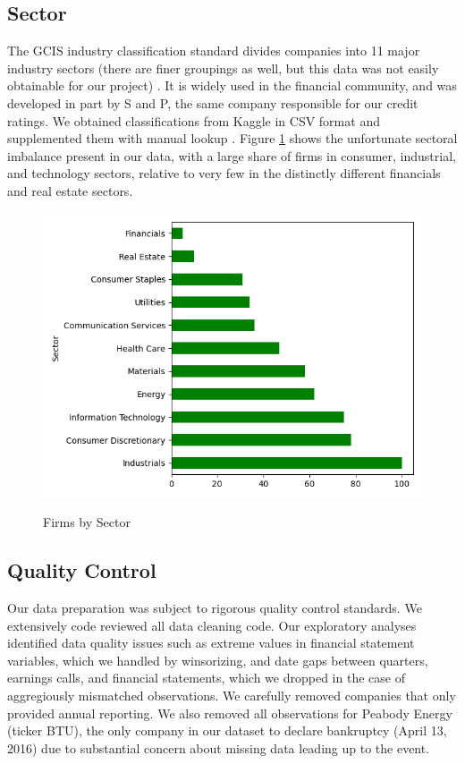 \documentclass{article}[11pt]
\begin{document}
    \subsection*{Sector}

    The GCIS industry classification standard divides companies into 11 major industry sectors (there are finer groupings as well, but this data was not easily obtainable for our project) \citep{s_and_p_gics_2024}. It is widely used in the financial community, and was developed in part by S and P, the same company responsible for our credit ratings. We obtained classifications from Kaggle in CSV format and supplemented them with manual lookup \citep{kozlov_us_2022}. Figure \ref{fig:firms-by-sector} shows the unfortunate sectoral imbalance present in our data, with a large share of firms in consumer, industrial, and technology sectors, relative to very few in the distinctly different financials and real estate sectors.

    \begin{figure}[h!]
		\centering
        \caption{Firms by Sector}
        \includegraphics[width=0.5\linewidth,keepaspectratio=true]{../Output/All Data EDA/Tabular EDA/all_data_fixed_quarter_dates_firms_by_sector_no_title.png}
        \label{fig:firms-by-sector}
	\end{figure}

    \subsection*{Quality Control}

    Our data preparation was subject to rigorous quality control standards. We extensively code reviewed all data cleaning code. Our exploratory analyses identified data quality issues such as extreme values in financial statement variables, which we handled by winsorizing, and date gaps between quarters, earnings calls, and financial statements, which we dropped in the case of aggregiously mismatched observations. We carefully removed companies that only provided annual reporting. We also removed all observations for Peabody Energy (ticker BTU), the only company in our dataset to declare bankruptcy (April 13, 2016) due to substantial concern about missing data leading up to the event.
\end{document}
